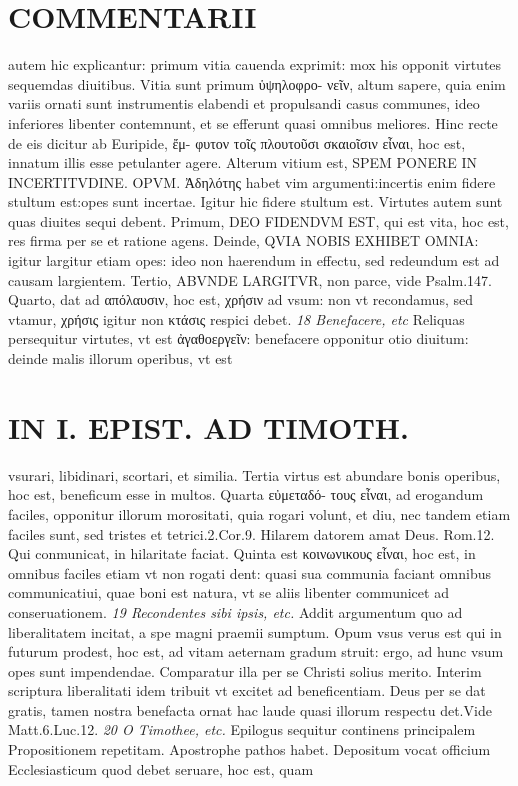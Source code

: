 \documentclass{article}
\begin{document}
\begin{pages}
\section*{COMMENTARII }
\marginpar{[ p.168 ]}\pstart autem hic explicantur: primum vitia cauenda exprimit: mox his opponit virtutes sequemdas diuitibus. Vitia sunt primum ὑψηλοφρο- νεῖν, altum sapere, quia enim variis ornati sunt instrumentis elabendi et propulsandi casus communes, ideo inferiores libenter contemnunt, et se efferunt quasi omnibus meliores.  \pend\pstart Hinc recte de eis dicitur ab Euripide, ἔμ- φυτον τοῖς πλουτοῦσι σκαιοῖσιν εἶναι, hoc est, innatum illis esse petulanter agere. Alterum vitium est, SPEM PONERE IN INCERTITVDINE. OPVM. Ἀδηλότης  habet vim argumenti:incertis enim fidere stultum est:opes sunt incertae. Igitur hic fidere stultum est.  \pend\pstart Virtutes autem sunt quas diuites sequi debent. Primum, DEO FIDENDVM EST, qui est vita, hoc est, res firma per se et ratione agens. Deinde, QVIA NOBIS EXHIBET OMNIA: igitur largitur etiam opes: ideo non haerendum in effectu, sed redeundum est ad causam largientem. Tertio, ABVNDE LARGITVR, non parce, vide Psalm.147. Quarto, dat ad απόλαυσιν, hoc est, χρήσιν ad vsum: non vt recondamus, sed vtamur, χρήσις igitur non κτάσις respici debet.  \pend
\textit{18 Benefacere, etc }\pstart Reliquas persequitur virtutes, vt est ἀγαθοεργεῖν: benefacere opponitur otio diuitum: deinde malis illorum operibus, vt est  \pend
\section*{IN I. EPIST. AD TIMOTH. }
\marginpar{[ p.169 ]}\pstart vsurari, libidinari, scortari, et similia. Tertia virtus est abundare bonis operibus, hoc est, beneficum esse in multos. Quarta εὐμεταδό- τους εἶναι, ad erogandum faciles, opponitur illorum morositati, quia rogari volunt, et diu, nec tandem etiam faciles sunt, sed tristes et tetrici.2.Cor.9. Hilarem datorem amat Deus. Rom.12. Qui conmunicat, in hilaritate faciat. Quinta est κοινωνικους εἶναι, hoc est, in omnibus faciles etiam vt non rogati dent: quasi sua communia faciant omnibus communicatiui, quae boni est natura, vt se aliis libenter communicet ad conseruationem.  \pend
\textit{19 Recondentes sibi ipsis, etc. }\pstart Addit argumentum quo ad liberalitatem incitat, a spe magni praemii sumptum. Opum vsus verus est qui in futurum prodest, hoc est, ad vitam aeternam gradum struit: ergo, ad hunc vsum opes sunt impendendae. Comparatur illa per se Christi solius merito. Interim scriptura liberalitati idem tribuit vt excitet ad beneficentiam. Deus per se dat gratis, tamen nostra benefacta ornat hac laude quasi illorum respectu det.Vide Matt.6.Luc.12.  \pend
\textit{20 O Timothee, etc. }\pstart Epilogus sequitur continens principalem Propositionem repetitam. Apostrophe pathos habet. Depositum vocat officium Ecclesiasticum quod debet seruare, hoc est, quam  \pend

\end{pages}
\end{document}
